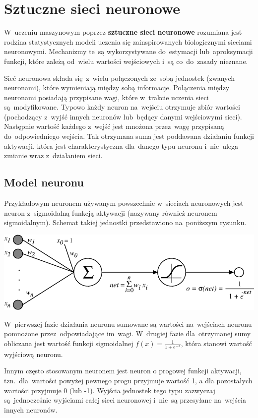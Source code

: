 \chapter{Sztuczne sieci neuronowe}
W~uczeniu maszynowym poprzez \textbf{sztuczne sieci neuronowe} rozumiana jest rodzina statystycznych modeli
uczenia się zainspirowanych biologicznymi sieciami neuronowymi. Mechanizmy te~są wykorzystywane do~estymacji
lub~aproksymacji funkcji, które zależą od~wielu wartości wejściowych i~są co~do~zasady nieznane.

Sieć neuronowa składa się~z~wielu połączonych ze~sobą jednostek (zwanych neuronami), które wymieniają między
sobą informacje. Połączenia między neuronami posiadają przypisane wagi, które w~trakcie uczenia sieci
są~modyfikowane. Typowo każdy neuron na~wejściu otrzymuje zbiór wartości (pochodzący z~wyjść innych neuronów
lub~będący danymi wejściowymi sieci). Następnie wartość każdego z~wejść jest mnożona przez~wagę przypisaną
do~odpowiedniego wejścia. Tak otrzymana suma jest poddawana działaniu funkcji aktywacji, która jest
charakterystyczna dla~danego typu neuronu i~nie~ulega zmianie wraz z~działaniem sieci.

\section{Model neuronu}
Przykładowym neuronem używanym powszechnie w~sieciach neuronowych jest neuron z~sigmoidalną funkcją aktywacji
(nazywany również neuronem sigmoidalnym). Schemat takiej jednostki przedstawiono na~poniższym rysunku.

\begin{Figure}
	\centering
	\includegraphics[width=\linewidth]{img/sigmoid-neuron.png}
\end{Figure}

W~pierwszej fazie działania neuronu sumowane są wartości na~wejściach neuronu pomnożone przez~odpowiadające
im~wagi. W~drugiej fazie dla~otrzymanej sumy obliczana jest wartość funkcji sigmoidalnej
$f(x)=\frac{1}{1+e^{-x}}$, która stanowi wartość wyjściową neuronu.

Innym często stosowanym neuronem jest neuron o progowej funkcji aktywacji, tzn.~dla~wartości powyżej pewnego
progu przyjmuje wartość 1, a dla pozostałych wartości przyjmuje 0 (lub -1). Wyjścia jednostek tego typu
zazwyczaj są~jednocześnie wyjściami całej sieci neuronowej i~nie~są przesyłane na~wejścia innych neuronów.

